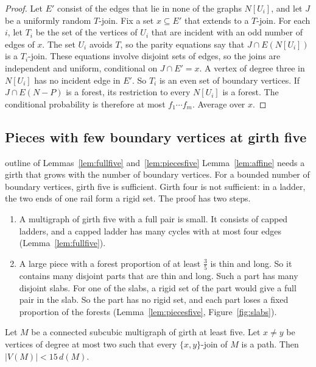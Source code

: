 \begin{proof}
Let $E'$ consist of the edges that lie in none of the graphs $N[U_i]$, and let $J$ be a uniformly
random $T$-join. Fix a set $x\subseteq E'$ that extends to a $T$-join. For each $i$, let $T_i$ be
the set of the vertices of $U_i$ that are incident with an odd number of edges of $x$. The set
$U_i$ avoids $T$, so the parity equations say that $J\cap E(N[U_i])$ is a $T_i$-join. These
equations involve disjoint sets of edges, so the joins are independent and uniform, conditional on
$J\cap E'=x$. A vertex of degree three in $N[U_i]$ has no incident edge in $E'$. So $T_i$ is an
even set of boundary vertices. If $J\cap E(N-P)$ is a forest, its restriction to every $N[U_i]$
is a forest. The conditional probability is therefore at most $f_1\cdots f_m$. Average over $x$.
\end{proof}

\subsection{Pieces with few boundary vertices at girth five}\label{sec:girthfive}

\begin{idea}{outline of Lemmas~\ref{lem:fullfive} and~\ref{lem:piecesfive}}
Lemma~\ref{lem:affine} needs a girth that grows with the number of boundary vertices. For a
bounded number of boundary vertices, girth five is sufficient. Girth four is not sufficient: in
a ladder, the two ends of one rail form a rigid set. The proof has two steps.
\begin{enumerate}[leftmargin=1.5em]
\item A multigraph of girth five with a full pair is small. It consists of capped ladders, and
a capped ladder has many cycles with at most four edges (Lemma~\ref{lem:fullfive}).
\item A large piece with a forest proportion of at least $\frac35$ is thin and long. So it
contains many disjoint parts that are thin and long. Such a part has many disjoint slabs. For
one of the slabs, a rigid set of the part would give a full pair in the slab. So the part has no
rigid set, and each part loses a fixed proportion of the forests
(Lemma~\ref{lem:piecesfive}, Figure~\ref{fig:slabs}).
\end{enumerate}
\end{idea}

\begin{lemma}\label{lem:fullfive}
Let $M$ be a connected subcubic multigraph of girth at least five. Let $x\ne y$ be vertices of
degree at most two such that every $\{x,y\}$-join of $M$ is a path. Then $|V(M)|<15\,d(M)$.
\end{lemma}

